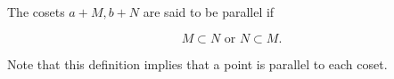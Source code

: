 The cosets $a + M, b + N$ are said to be parallel if

$$M \subset N \text{ or } N \subset M.$$

Note that this definition implies that a point is parallel to each coset.
